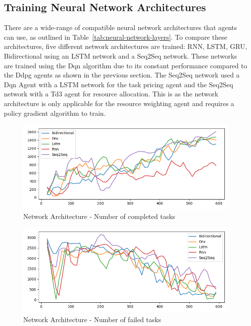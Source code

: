 \subsection{Training Neural Network Architectures}
\label{subsec:neural-network-architecture-training}
There are a wide-range of compatible neural network architectures that agents can use, as outlined in
Table~\ref{tab:neural-network-layers}. To compare these architectures, five different network architectures are trained:
RNN, LSTM, GRU, Bidirectional using an LSTM network and
a Seq2Seq network. These networks are trained using the Dqn algorithm due to its constant performance compared to the
Ddpg agents as shown in the previous section. The Seq2Seq network used a Dqn Agent with a LSTM network for the task
pricing agent and the Seq2Seq network with a Td3 agent for resource allocation. This is as the network architecture is
only applicable for the resource weighting agent and requires a policy gradient algorithm to train.

\begin{figure}[H]
    \centering
    \includegraphics[width=\linewidth]{figures/5_evaluation_figs/net_arch_training_fig/num_completed_tasks.png}
    \caption{Network Architecture - Number of completed tasks}
    \label{fig:net_arch_num_completed_tasks}
\end{figure}

\begin{figure}[H]
    \centering
    \includegraphics[width=\linewidth]{figures/5_evaluation_figs/net_arch_training_fig/num_failed_tasks.png}
    \caption{Network Architecture - Number of failed tasks}
    \label{fig:net_arch_num_failed_tasks}
\end{figure}

